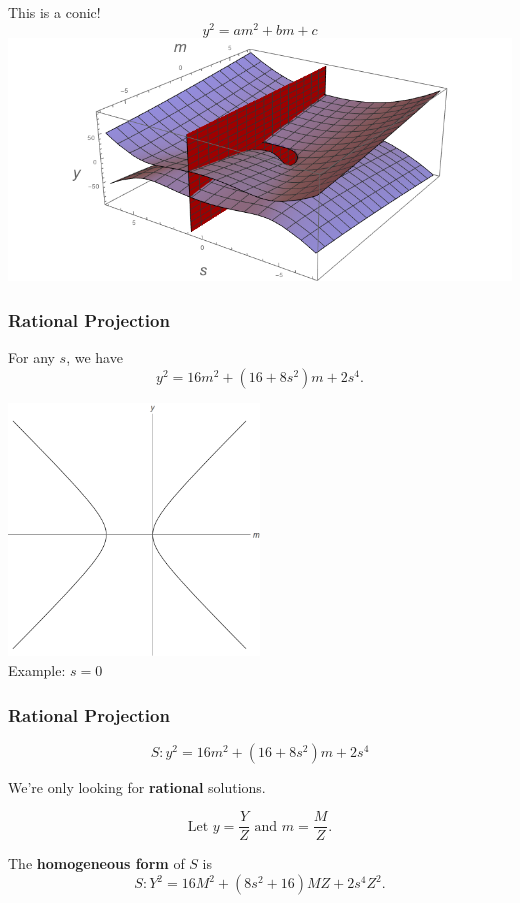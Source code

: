 \begin{frame}[allowframebreaks]
	This is a conic! $$y^2 = am^2 + bm + c$$
	\phantom{hi}
	\includegraphics[width=\textwidth]{CSPlot.png}
\end{frame}

\begin{frame}
	\frametitle{Rational Projection}
	For any $s$, we have
	$$y^2 = 16m^2 + (16+8s^2)m + 2s^4.$$
	\pause
	\begin{center}
	\includegraphics[width=0.5\textwidth]{s0Plot.png} \\
	Example: $s=0$
	\end{center}
\end{frame}
	
\begin{frame}
	\frametitle{Rational Projection}
	$$S: y^2 = 16m^2 + (16+8s^2)m + 2s^4$$
	\pause
	\begin{obs}
		We're only looking for \textbf{rational} solutions.
	\end{obs}
	\pause
	$$\mbox{Let }y = \frac{Y}{Z}\mbox{ and }m = \frac{M}{Z}.$$
	\pause
	\begin{defn}
		The \textbf{homogeneous form} of $S$ is
		$$S: Y^2 = 16 M^2 + (8 s^2 + 16) M Z + 2 s^4 Z^2.$$
	\end{defn}
\end{frame}


